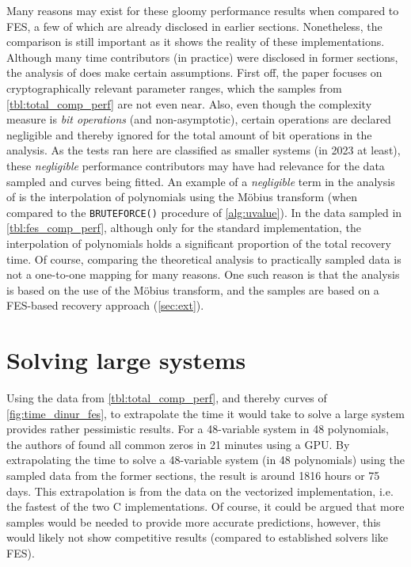 Many reasons may exist for these gloomy performance results when compared to FES, a few of which are already disclosed in earlier sections. Nonetheless, the comparison is still important as it shows the reality of these implementations. Although many time contributors (in practice) were disclosed in former sections, the analysis of \cite{eurocrypt-2021-30841} does make certain assumptions. First off, the paper focuses on cryptographically relevant parameter ranges, which the samples from \cref{tbl:total_comp_perf} are not even near. Also, even though the complexity measure is \textit{bit operations} (and non-asymptotic), certain operations are declared negligible and thereby ignored for the total amount of bit operations in the analysis. As the tests ran here are classified as smaller systems (in 2023 at least), these \textit{negligible} performance contributors may have had relevance for the data sampled and curves being fitted. An example of a \textit{negligible} term in the analysis of \cite{eurocrypt-2021-30841} is the interpolation of polynomials using the Möbius transform (when compared to the \texttt{BRUTEFORCE()} procedure of \cref{alg:uvalue}). In the data sampled in \cref{tbl:fes_comp_perf}, although only for the standard implementation, the interpolation of polynomials holds a significant proportion of the total recovery time. Of course, comparing the theoretical analysis to practically sampled data is not a one-to-one mapping for many reasons. One such reason is that the analysis is based on the use of the Möbius transform, and the samples are based on a FES-based recovery approach (\cref{sec:ext}).

\section{Solving large systems} \label{sec:eval:large}
Using the data from \cref{tbl:total_comp_perf}, and thereby curves of \cref{fig:time_dinur_fes}, to extrapolate the time it would take to solve a large system provides rather pessimistic results. For a 48-variable system in 48 polynomials, the authors of \cite{ches-2010-23990} found all common zeros in 21 minutes using a GPU. By extrapolating the time to solve a 48-variable system (in 48 polynomials) using the sampled data from the former sections, the result is around 1816 hours or 75 days. This extrapolation is from the data on the vectorized implementation, i.e. the fastest of the two C implementations. Of course, it could be argued that more samples would be needed to provide more accurate predictions, however, this would likely not show competitive results (compared to established solvers like FES). 

